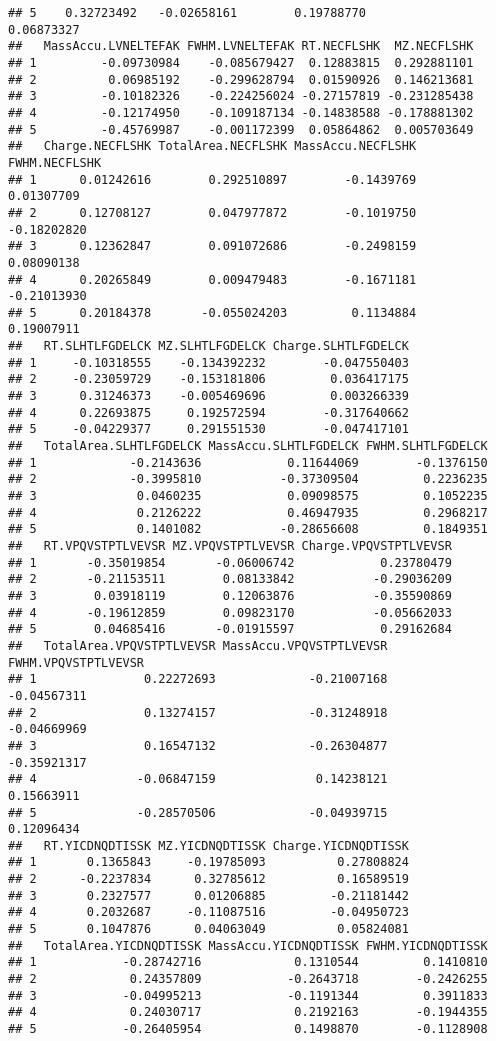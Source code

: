 \documentclass[]{article}
\begin{document}
\begin{verbatim}
## 5    0.32723492   -0.02658161        0.19788770           0.06873327
##   MassAccu.LVNELTEFAK FWHM.LVNELTEFAK RT.NECFLSHK  MZ.NECFLSHK
## 1         -0.09730984    -0.085679427  0.12883815  0.292881101
## 2          0.06985192    -0.299628794  0.01590926  0.146213681
## 3         -0.10182326    -0.224256024 -0.27157819 -0.231285438
## 4         -0.12174950    -0.109187134 -0.14838588 -0.178881302
## 5         -0.45769987    -0.001172399  0.05864862  0.005703649
##   Charge.NECFLSHK TotalArea.NECFLSHK MassAccu.NECFLSHK FWHM.NECFLSHK
## 1      0.01242616        0.292510897        -0.1439769    0.01307709
## 2      0.12708127        0.047977872        -0.1019750   -0.18202820
## 3      0.12362847        0.091072686        -0.2498159    0.08090138
## 4      0.20265849        0.009479483        -0.1671181   -0.21013930
## 5      0.20184378       -0.055024203         0.1134884    0.19007911
##   RT.SLHTLFGDELCK MZ.SLHTLFGDELCK Charge.SLHTLFGDELCK
## 1     -0.10318555    -0.134392232        -0.047550403
## 2     -0.23059729    -0.153181806         0.036417175
## 3      0.31246373    -0.005469696         0.003266339
## 4      0.22693875     0.192572594        -0.317640662
## 5     -0.04229377     0.291551530        -0.047417101
##   TotalArea.SLHTLFGDELCK MassAccu.SLHTLFGDELCK FWHM.SLHTLFGDELCK
## 1             -0.2143636            0.11644069        -0.1376150
## 2             -0.3995810           -0.37309504         0.2236235
## 3              0.0460235            0.09098575         0.1052235
## 4              0.2126222            0.46947935         0.2968217
## 5              0.1401082           -0.28656608         0.1849351
##   RT.VPQVSTPTLVEVSR MZ.VPQVSTPTLVEVSR Charge.VPQVSTPTLVEVSR
## 1       -0.35019854       -0.06006742            0.23780479
## 2       -0.21153511        0.08133842           -0.29036209
## 3        0.03918119        0.12063876           -0.35590869
## 4       -0.19612859        0.09823170           -0.05662033
## 5        0.04685416       -0.01915597            0.29162684
##   TotalArea.VPQVSTPTLVEVSR MassAccu.VPQVSTPTLVEVSR FWHM.VPQVSTPTLVEVSR
## 1               0.22272693             -0.21007168         -0.04567311
## 2               0.13274157             -0.31248918         -0.04669969
## 3               0.16547132             -0.26304877         -0.35921317
## 4              -0.06847159              0.14238121          0.15663911
## 5              -0.28570506             -0.04939715          0.12096434
##   RT.YICDNQDTISSK MZ.YICDNQDTISSK Charge.YICDNQDTISSK
## 1       0.1365843     -0.19785093          0.27808824
## 2      -0.2237834      0.32785612          0.16589519
## 3       0.2327577      0.01206885         -0.21181442
## 4       0.2032687     -0.11087516         -0.04950723
## 5       0.1047876      0.04063049          0.05824081
##   TotalArea.YICDNQDTISSK MassAccu.YICDNQDTISSK FWHM.YICDNQDTISSK
## 1            -0.28742716             0.1310544         0.1410810
## 2             0.24357809            -0.2643718        -0.2426255
## 3            -0.04995213            -0.1191344         0.3911833
## 4             0.24030717             0.2192163        -0.1944355
## 5            -0.26405954             0.1498870        -0.1128908
\end{verbatim}
\end{document}

